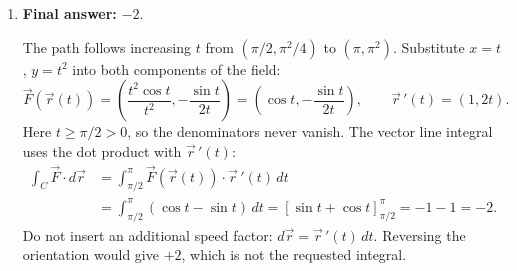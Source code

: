 \documentclass[12pt]{exam}
\begin{document}
\begin{enumerate}
For the fly's path,
\[
\begin{aligned}
  \vec r(t)&=(\cos t,\sin t,2+\cos t+\sin t),\\
  \vec r\,'(t)&=(-\sin t,\cos t,\cos t-\sin t),\\
  \|\vec r\,'(t)\|
    &=\sqrt{\sin^2t+\cos^2t+(\cos t-\sin t)^2}
     =\sqrt{1+(\cos t-\sin t)^2}.
\end{aligned}
\]
The scent intensity along the path is
\[
  \sigma(\vec r(t))=\sqrt{1+(\cos t-\sin t)^2}
     =\|\vec r\,'(t)\|.
\]
For a scalar line integral, multiply the scalar field by the speed:
$ds=\|\vec r\,'(t)\|\,dt$, not just $dt$. Thus
\[
\begin{aligned}
  S&=\int_0^{2\pi}\sigma(\vec r(t))\|\vec r\,'(t)\|\,dt\\
   &=\int_0^{2\pi}\bigl(1+(\cos t-\sin t)^2\bigr)\,dt
     =\int_0^{2\pi}(2-\sin2t)\,dt\\
   &=\left[2t+\tfrac12\cos2t\right]_0^{2\pi}=4\pi.
\end{aligned}
\]
This is scent intensity weighted by distance traveled, not a time integral
of scent intensity. Reversing the flight direction would not change this
scalar line integral.

\newpage

\item \textbf{Final answer:} $\boxed{-2}$.

The path follows increasing $t$ from $(\pi/2,\pi^2/4)$ to $(\pi,\pi^2)$.
Substitute $x=t$, $y=t^2$ into both components of the field:
\[
  \vec F(\vec r(t))
    =\left(\frac{t^2\cos t}{t^2},-\frac{\sin t}{2t}\right)
    =\left(\cos t,-\frac{\sin t}{2t}\right),
  \qquad \vec r\,'(t)=(1,2t).
\]
Here $t\geq\pi/2>0$, so the denominators never vanish. The vector
line integral uses the dot product with $\vec r\,'(t)$:
\[
\begin{aligned}
  \int_C\vec F\cdot d\vec r
    &=\int_{\pi/2}^{\pi}\vec F(\vec r(t))\cdot\vec r\,'(t)\,dt\\
    &=\int_{\pi/2}^{\pi}(\cos t-\sin t)\,dt
      =[\sin t+\cos t]_{\pi/2}^{\pi}=-1-1=-2.
\end{aligned}
\]
Do not insert an additional speed factor: $d\vec r=\vec r\,'(t)\,dt$.
Reversing the orientation would give $+2$, which is not the requested
integral.


\end{enumerate}
\end{document}
